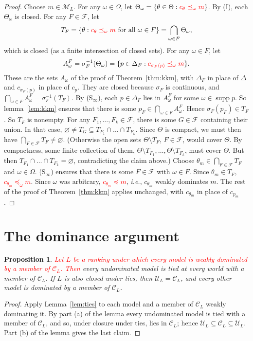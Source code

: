 \documentclass[11pt]{article}
\newtheorem{proposition}[theorem]{Proposition}
\theoremstyle{definition}
\newcommand{\M}{\mathcal M}
\newcommand{\C}{\mathcal C}
\newcommand{\F}{\mathcal F}
\newcommand{\U}{\mathcal U}
\newcommand{\supp}{\operatorname{supp}}
\newcommand{\new}[1]{\textcolor{red}{#1}}
\begin{document}
\begin{proof}
Choose $m\in\M_L$. For any $\omega\in\Omega$, let $\Theta_\omega=\{\theta\in\Theta:\textcolor{red}{c_\theta\preceq_\omega m}\}$. By (I), each $\Theta_\omega$ is closed. For any $F\in\F$, let
\[
 T_F=\{\theta:\textcolor{red}{c_\theta\preceq_\omega m}\text{ for all }\omega\in F\} = \bigcap_{\omega\in F}\Theta_\omega,
\]
which is closed (as a finite intersection of closed sets). For any $\omega\in F$, let 
\[
A^F_\omega=\sigma_F^{-1}(\Theta_\omega)=\{p\in\Delta_F:\textcolor{red}{c_{\sigma_F(p)}\preceq_\omega m}\}.
\]
These are the sets $A_\omega$ of the proof of Theorem~\ref{thm:kkm}, with $\Delta_F$ in place of $\Delta$ and $c_{\sigma_F(p)}$ in place of $c_p$. They are closed because $\sigma_F$ is continuous, and $\bigcap_{\omega\in F}A^F_\omega=\sigma_F^{-1}(T_F)$. By (S$_\infty$), each $p\in\Delta_F$ lies in $A^F_\omega$ for some $\omega\in\supp p$. So lemma~\ref{lem:kkm} ensures that there is some $p_F\in\bigcap_{\omega\in F}A^F_\omega$. Hence $\sigma_F(p_F)\in T_F$. So $T_F$ is nonempty. For any $F_1,\dots,F_k\in\F$, there is some $G\in\F$ containing their union. In that case, $\varnothing\ne T_G\subseteq T_{F_1}\cap\dots\cap T_{F_k}$. Since $\Theta$ is compact, we must then have $\bigcap_{F\in\F}T_F\neq \varnothing$. (Otherwise the open sets $\Theta\setminus T_F$, $F\in\F$, would cover $\Theta$. By compactness, some finite collection of them, $\Theta\setminus T_{F_1},\dots,\Theta\setminus T_{F_k}$, must cover $\Theta$. But then $T_{F_1}\cap\dots\cap T_{F_k}=\varnothing$, contradicting the claim above.) Choose $\theta_m\in\bigcap_{F\in\F}T_F$ and $\omega\in\Omega$. (S$_\infty$) ensures that there is some $F\in\F$ with $\omega\in F$. Since $\theta_m\in T_F$, \textcolor{red}{$c_{\theta_m}\preceq_\omega m$}. Since $\omega$ was arbitrary, \textcolor{red}{$c_{\theta_m}\preceq m$}, \textit{i.e.}, $c_{\theta_m}$ weakly dominates $m$. The rest of the proof of Theorem~\ref{thm:kkm} applies unchanged, with $c_{\theta_m}$ in place of $c_{p_m}$.
\end{proof}



\section{The dominance argument}\label{sec:conclusion}

\begin{proposition}\label{prop:conclusion}
\new{Let $L$ be a ranking under which every model is weakly dominated by a member of $\C_L$. Then} every undominated model is tied at every world with a member of $\C_L$. If $L$ is also closed under ties, then $\U_L=\C_L$, and every other model is dominated by a member of $\C_L$.
\end{proposition}
\begin{proof}
Apply Lemma~\ref{lem:ties} to each model and a member of $\C_L$ weakly dominating it. By part (a) of the lemma every undominated model is tied with a member of $\C_L$, and so, under closure under ties, lies in $\C_L$; hence $\U_L\subseteq\C_L\subseteq\U_L$. Part (b) of the lemma gives the last claim.
\end{proof}
\end{document}
